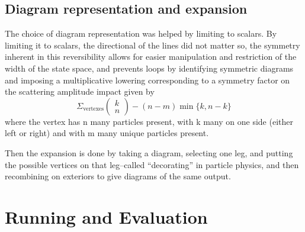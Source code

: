 \documentclass{article}
\begin{document}
\subsection{Diagram representation and expansion}
\hspace{0.5 cm} The choice of diagram representation was helped by limiting to scalars. By limiting it to scalars, the directional of the lines did not matter so, the symmetry inherent in this reversibility allows for easier manipulation and restriction of the width of the state space, and prevents loops by identifying symmetric diagrams and imposing a multiplicative lowering corresponding to a symmetry factor on the scattering amplitude impact given by 
\begin{equation}
	\Sigma_{\textrm{vertexes}} \left( \begin{array}{c} k \\ n \end{array} \right)- (n-m) \min\{k, n-k\}  
\end{equation}
where the vertex has n many particles present, with k many on one side (either left or right) and with m many unique particles present. 

\hspace{0.5 cm} Then the expansion is done by taking a diagram, selecting one leg, and putting the possible vertices on that leg--called ``decorating'' in particle physics, and then recombining on exteriors to give diagrams of the same output.
\section{Running and Evaluation}
\end{document}
